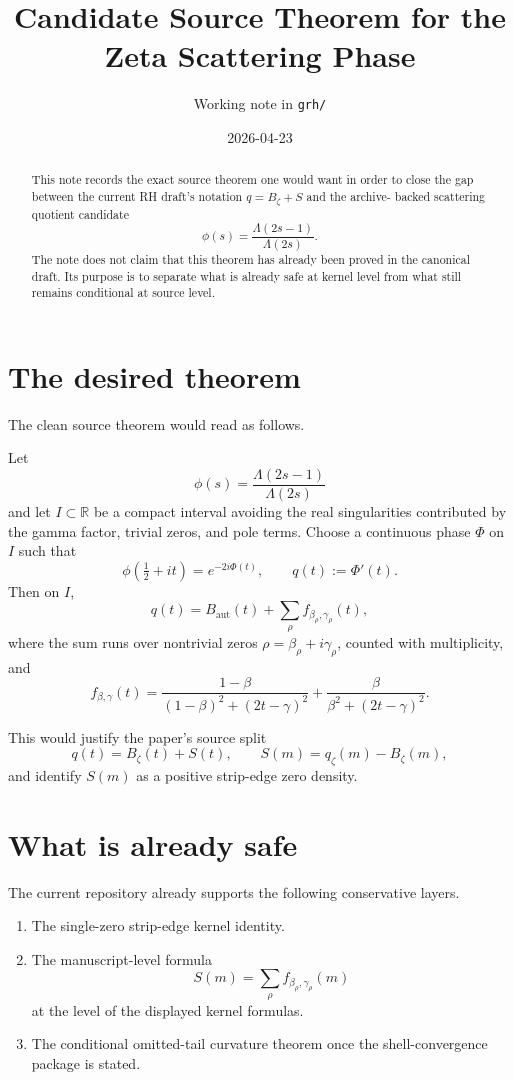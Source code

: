 \documentclass[11pt]{article}
\title{Candidate Source Theorem for the Zeta Scattering Phase}
\author{Working note in \texttt{grh/}}
\date{2026-04-23}
\begin{document}
\maketitle

\begin{abstract}
This note records the exact source theorem one would want in order to close the
gap between the current RH draft's notation \(q=B_\zeta+S\) and the archive-
backed scattering quotient candidate
\[
\phi(s)=\frac{\Lambda(2s-1)}{\Lambda(2s)}.
\]
The note does not claim that this theorem has already been proved in the
canonical draft. Its purpose is to separate what is already safe at kernel
level from what still remains conditional at source level.
\end{abstract}

\section{The desired theorem}

The clean source theorem would read as follows.

\medskip
\noindent
Let
\[
\phi(s)=\frac{\Lambda(2s-1)}{\Lambda(2s)}
\]
and let \(I\subset\mathbb R\) be a compact interval avoiding the real
singularities contributed by the gamma factor, trivial zeros, and pole terms.
Choose a continuous phase \(\Phi\) on \(I\) such that
\[
\phi\!\left(\tfrac12+it\right)=e^{-2i\Phi(t)},
\qquad q(t):=\Phi'(t).
\]
Then on \(I\),
\[
q(t)=B_{\mathrm{aut}}(t)+\sum_\rho f_{\beta_\rho,\gamma_\rho}(t),
\]
where the sum runs over nontrivial zeros \(\rho=\beta_\rho+i\gamma_\rho\),
counted with multiplicity, and
\[
f_{\beta,\gamma}(t)=
\frac{1-\beta}{(1-\beta)^2+(2t-\gamma)^2}
+
\frac{\beta}{\beta^2+(2t-\gamma)^2}.
\]

This would justify the paper's source split
\[
q(t)=B_\zeta(t)+S(t),
\qquad
S(m)=q_\zeta(m)-B_\zeta(m),
\]
and identify \(S(m)\) as a positive strip-edge zero density.

\section{What is already safe}

The current repository already supports the following conservative layers.

\begin{enumerate}
\item The single-zero strip-edge kernel identity.
\item The manuscript-level formula
\[
S(m)=\sum_\rho f_{\beta_\rho,\gamma_\rho}(m)
\]
at the level of the displayed kernel formulas.
\item The conditional omitted-tail curvature theorem once the shell-convergence
package is stated.
\end{enumerate}
\end{document}

